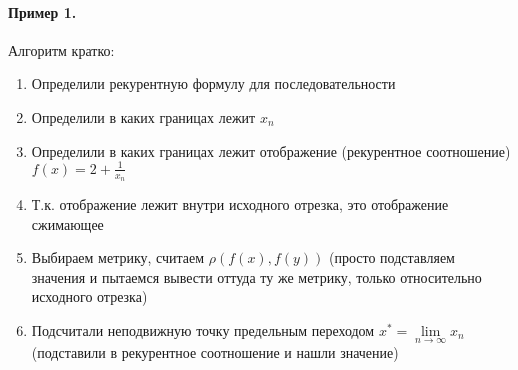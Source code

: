 \documentclass{article}[12pt]
\begin{document}
\paragraph{Пример 1.}
Алгоритм кратко:
\begin{enumerate}
    \item Определили рекурентную формулу для последовательности
    \item Определили в каких границах лежит $x_{n}$
    \item Определили в каких границах лежит отображение (рекурентное соотношение)
        $f(x)=2+\frac{1}{x_{n}}$
    \item Т.к. отображение лежит внутри исходного отрезка, это отображение сжимающее
    \item Выбираем метрику, считаем $\rho(f(x),f(y))$ (просто подставляем значения
        и пытаемся вывести оттуда ту же метрику, только относительно исходного отрезка)
    \item Подсчитали неподвижную точку предельным переходом
        $x^{*}=\lim\limits_{n\rightarrow \infty}x_{n}$
        (подставили в рекурентное соотношение и нашли значение)
\end{enumerate}
\end{document}
